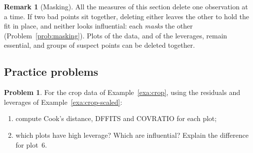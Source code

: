 \documentclass[11pt,a4paper]{article}
\numberwithin{equation}{section}
\theoremstyle{definition}
\newtheorem*{remark}{Remark}
\newtheorem{problemx}{Problem}[subsection]
\newenvironment{problem}{\begin{problemx}}{\end{problemx}}
\begin{document}
\begin{remark}[Masking]
All the measures of this section delete one observation at a time. If two bad points sit
together, deleting either leaves the other to hold the fit in place, and neither looks
influential: each \emph{masks} the other (Problem~\ref{prob:masking}). Plots of the data, and
of the leverages, remain essential, and groups of suspect points can be deleted together.
\end{remark}

\subsection{Practice problems}
\begin{problem}\label{prob:crop-infl}
For the crop data of Example~\ref{exa:crop}, using the residuals and leverages of
Example~\ref{exa:crop-scaled}:
\begin{enumerate}[label=(\alph*)]
\item compute Cook's distance, DFFITS and COVRATIO for each plot;
\item which plots have high leverage? Which are influential? Explain the difference for plot~6.
\end{enumerate}
\end{problem}
\end{document}
